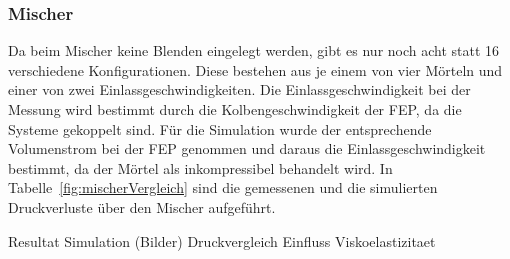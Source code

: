 \subsubsection{Mischer}
Da beim Mischer keine Blenden eingelegt werden, gibt es nur noch acht statt 16 verschiedene Konfigurationen. Diese bestehen aus je einem von vier Mörteln und einer von zwei Einlassgeschwindigkeiten.
Die Einlassgeschwindigkeit bei der Messung wird bestimmt durch die Kolbengeschwindigkeit der FEP, da die Systeme gekoppelt sind. Für die Simulation wurde der entsprechende Volumenstrom bei der FEP genommen und daraus die Einlassgeschwindigkeit bestimmt, da der Mörtel als inkompressibel behandelt wird.
In Tabelle~\ref{fig:mischerVergleich} sind die gemessenen und die simulierten Druckverluste über den Mischer aufgeführt.
%
\begin{table}[htb]
\noindent{}
    \caption{Die gemessenen und simulierten Konfigurationen des Mischers mit den rein scherratenabhängigen Modellen.}
    \label{fig:mischerVergleich}
\end{table}
\begin{todocontent}
    \1 Resultat Simulation (Bilder)
    \1 Druckvergleich
    \1 Einfluss Viskoelastizitaet
\end{todocontent}
